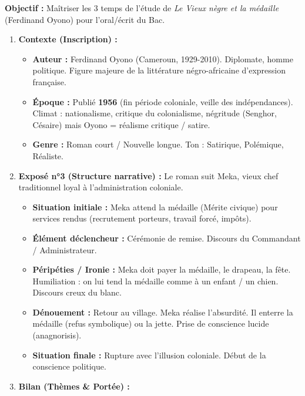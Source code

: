 \documentclass[11pt]{article}
\newcommand{\cle}[1]{{\popxbold\color{popdark}#1}}
\begin{document}
\begin{methode}
    \textbf{Objectif :} Maîtriser les 3 temps de l'étude de \emph{Le Vieux nègre et la médaille} (Ferdinand Oyono) pour l'oral/écrit du Bac.
    \begin{enumerate}
        \item \textbf{Contexte (Inscription) :}
            \begin{itemize}
                \item \textbf{Auteur :} Ferdinand \cle{Oyono} (Cameroun, 1929-2010). Diplomate, homme politique. Figure majeure de la \cle{littérature négro-africaine d'expression française}.
                \item \textbf{Époque :} Publié \textbf{1956} (fin période coloniale, veille des indépendances). Climat : nationalisme, critique du colonialisme, \cle{négritude} (Senghor, Césaire) mais Oyono = \cle{réalisme critique / satire}.
                \item \textbf{Genre :} \cle{Roman court} / \cle{Nouvelle longue}. Ton : \cle{Satirique}, \cle{Polémique}, \cle{Réaliste}.
            \end{itemize}
        \item \textbf{Exposé n°3 (Structure narrative) :} Le roman suit \cle{Meka}, vieux chef traditionnel loyal à l'administration coloniale.
            \begin{itemize}
                \item \textbf{Situation initiale :} Meka attend la médaille (Mérite civique) pour services rendus (recrutement porteurs, travail forcé, impôts).
                \item \textbf{Élément déclencheur :} Cérémonie de remise. Discours du Commandant / Administrateur.
                \item \textbf{Péripéties / Ironie :} Meka doit payer la médaille, le drapeau, la fête. Humiliation : on lui tend la médaille comme à un enfant / un chien. Discours creux du blanc.
                \item \textbf{Dénouement :} Retour au village. Meka réalise l'absurdité. Il enterre la médaille (refus symbolique) ou la jette. Prise de conscience lucide (\cle{anagnorisis}).
                \item \textbf{Situation finale :} Rupture avec l'illusion coloniale. Début de la conscience politique.
            \end{itemize}
        \item \textbf{Bilan (Thèmes \& Portée) :}

\end{enumerate}
\end{methode}
\end{document}
